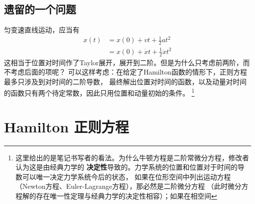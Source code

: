     \subsection{遗留的一个问题}
    匀变速直线运动，应当有
    \begin{align*}
        x(t) &= x(0) + vt + \frac 12 at^2\\
        &= x(0) + \dot{x}t + \frac 12 \ddot{x}t^2
    \end{align*}
    这相当于位置对时间作了Taylor展开，展开到二阶。但是为什么只考虑前两阶，而不考虑后面的项呢？
    可以这样考虑：在给定了Hamilton函数的情形下，正则方程最多只涉及到对时间的二阶导数，
    最终解出位置对时间的函数，以及动量对时间的函数只有两个待定常数，因此只用位置和动量初始的条件。
    \footnote{
        这里给出的是笔记书写者的看法。为什么牛顿方程是二阶常微分方程，修改者认为这是由经典力学的
        \textbf{决定性}导致的。力学系统的位置和位置对于时间的导数可以唯一决定力学系统今后的状态，
        如果在位形空间中列出运动方程（Newton方程、Euler-Lagrange方程），那必然是二阶微分方程
        （此时微分方程解的存在唯一性定理与经典力学的决定性相容）；如果在相空间
    }
    \section{Hamilton 正则方程}
